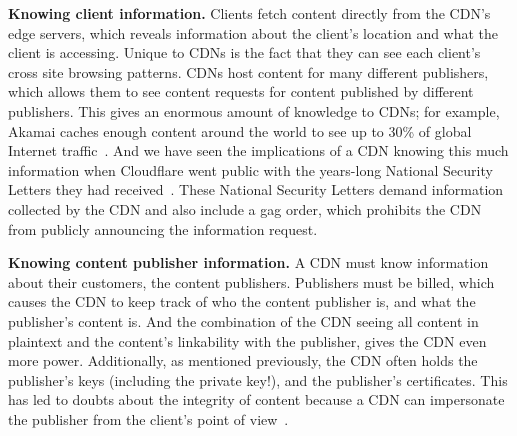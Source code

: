 {\bf Knowing client information.} Clients fetch content directly from the CDN's edge servers, which reveals 
information about the client's location and what the client is accessing.  Unique to CDNs is the fact that 
they can see each client's cross site browsing patterns.  CDNs host content for many different publishers, which allows 
them to see content requests for content published by different publishers.  This gives an enormous amount of 
knowledge to CDNs; for example, Akamai caches enough content around the world to see up to 30\% of global Internet 
traffic~\cite{akamai_global_traffic}.  And we have seen the implications of a CDN knowing this much information when Cloudflare 
went public with the years-long National Security Letters they had received~\cite{cloudflare_nsl}. These National Security Letters 
demand information collected by the CDN and also include a gag order, which prohibits the CDN from publicly announcing 
the information request.  

{\bf Knowing content publisher information.} A CDN must know information about their customers, the content 
publishers.  Publishers must be billed, which causes the CDN to keep track of who the content publisher is, and 
what the publisher's content is.  And the combination of the CDN seeing all content in plaintext and the content's 
linkability with the publisher, gives the CDN even more power.  Additionally, as mentioned previously, the CDN often 
holds the publisher's keys (including the private key!), and the publisher's certificates.  This has led to doubts 
about the integrity of content because a CDN can impersonate the publisher from the client's point of view~\cite{levy2015stickler}.


